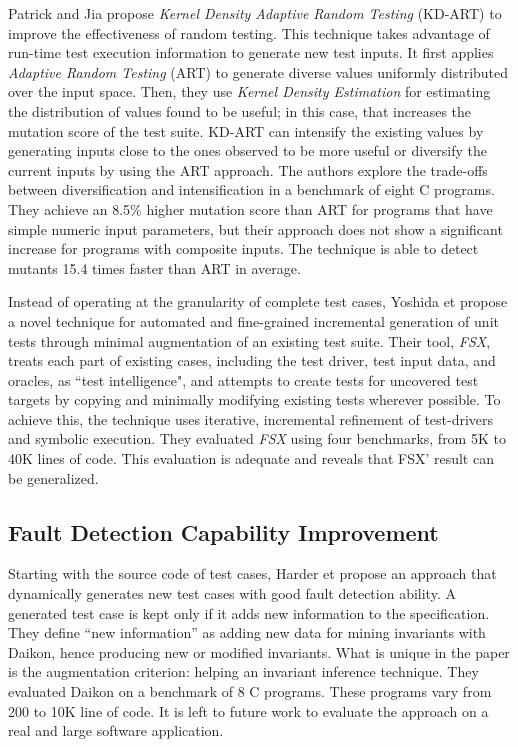 Patrick and Jia \cite{Patrick201736} propose \emph{Kernel Density Adaptive Random Testing} (KD-ART) to improve the effectiveness of random testing.
This technique takes advantage of run-time test execution information to generate new test inputs. 
It first applies \emph{Adaptive Random Testing} (ART) to generate diverse values uniformly distributed over the input space. 
Then, they use \emph{Kernel Density Estimation} for estimating the distribution of values found to be useful; in this case, that increases the mutation score of the test suite. 
KD-ART can intensify the existing values by generating inputs close to the ones observed to be more useful or diversify the current inputs by using the ART approach. 
The authors explore the trade-offs between diversification and intensification in a benchmark of eight C programs. 
They achieve an 8.5\% higher mutation score than ART for programs that have simple numeric input parameters, but their approach does not show a significant increase for programs with composite inputs. 
The technique is able to detect mutants 15.4 times faster than ART in average.

Instead of operating at the granularity of complete test cases, Yoshida et \etal\cite{Yoshida2016} propose a novel technique for automated and fine-grained incremental generation of unit tests through minimal augmentation  of an existing test suite. 
Their tool, \emph{FSX}, treats each part of existing cases, including the test driver, test input data, and oracles, as “test intelligence", and attempts to create tests for uncovered test targets by copying and minimally modifying existing tests wherever possible. 
To achieve this, the technique uses iterative, incremental refinement of test-drivers and symbolic execution.
They evaluated \emph{FSX} using four benchmarks, from 5K to 40K lines of code. 
This evaluation is adequate and reveals that FSX' result can be generalized.

\subsection{Fault Detection Capability Improvement}
\label{subsec:sota:category-1:fault-detection}

Starting with the source code of test cases, Harder et \etal\cite{Harder03} propose an approach that dynamically generates new test cases with good fault detection ability.
A generated test case is kept only if it adds new information to the specification.
They define ``new information'' as adding new data for mining invariants with Daikon, hence producing new or modified invariants. 
What is unique in the paper is the augmentation criterion: helping an invariant inference technique.
They evaluated Daikon on a benchmark of 8 C programs. 
These programs vary from 200 to 10K line of code. 
It is left to future work to evaluate the approach on a real and large software application.

